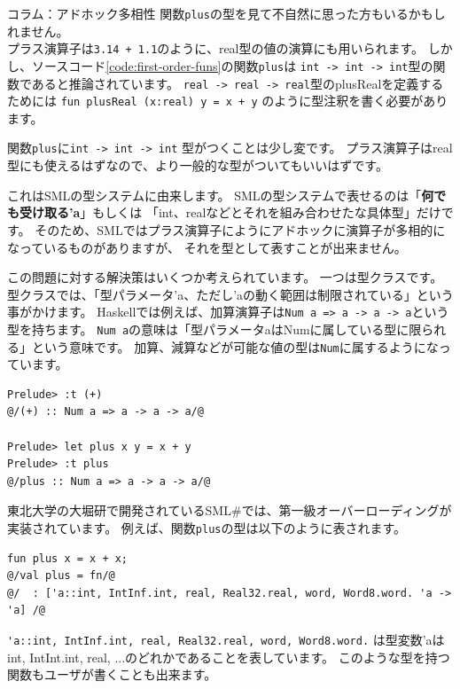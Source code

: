 \documentclass[11pt,a4paper]{article}
\begin{document}
\begin{itembox}[l]{コラム：アドホック多相性}
関数\lstinline{plus}の型を見て不自然に思った方もいるかもしれません。\\
プラス演算子は\lstinline{3.14 + 1.1}のように、real型の値の演算にも用いられます。
しかし、ソースコード\ref{code:first-order-funs}の関数\lstinline{plus}は
\lstinline{int -> int -> int}型の関数であると推論されています。
\lstinline{real -> real -> real}型のplusRealを定義するためには
\lstinline{fun plusReal (x:real) y = x + y}
のように型注釈を書く必要があります。

関数\lstinline{plus}に\lstinline{int -> int -> int}
型がつくことは少し変です。
プラス演算子はreal型にも使えるはずなので、より一般的な型がついてもいいはずです。

これはSMLの型システムに由来します。
SMLの型システムで表せるのは「\textbf{何でも受け取る'a}」もしくは
「int、realなどとそれを組み合わせたな具体型」だけです。
そのため、SMLではプラス演算子にようにアドホックに演算子が多相的になっているものがありますが、
それを型として表すことが出来ません。

この問題に対する解決策はいくつか考えられています。
一つは型クラスです。型クラスでは、「型パラメータ'a、ただし'aの動く範囲は制限されている」という事がかけます。
Haskellでは例えば、加算演算子は\lstinline{Num a => a -> a -> a}という型を持ちます。
\lstinline{Num a}の意味は「型パラメータaはNumに属している型に限られる」という意味です。
加算、減算などが可能な値の型は\lstinline{Num}に属するようになっています。

\begin{lstlisting}[caption=Haskellでのplusの型付け]
Prelude> :t (+)
@/(+) :: Num a => a -> a -> a/@

Prelude> let plus x y = x + y
Prelude> :t plus
@/plus :: Num a => a -> a -> a/@
\end{lstlisting}

東北大学の大堀研で開発されているSML\#\cite{smlsharp}では、第一級オーバーローディングが実装されています。
例えば、関数\lstinline{plus}の型は以下のように表されます。
\begin{lstlisting}[caption=SML\#でのplusの型付け]
fun plus x = x + x;
@/val plus = fn/@
@/  : ['a::int, IntInf.int, real, Real32.real, word, Word8.word. 'a -> 'a] /@
\end{lstlisting}
\lstinline{'a::int, IntInf.int, real, Real32.real, word, Word8.word.}
は型変数'aはint, IntInt.int, real, ...のどれかであることを表しています。
このような型を持つ関数もユーザが書くことも出来ます。

\end{itembox}
\end{document}
